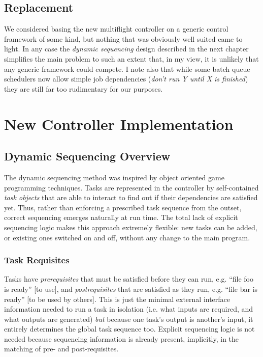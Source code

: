 \documentclass[11pt,a4paper]{report}
\begin{document}
\section{Replacement}

We considered basing the new multiflight controller on a generic control
framework of some kind, but nothing that was obviously well suited came
to light. In any case the {\em dynamic sequencing} design described in
the next chapter simplifies the main problem to such an extent that, in
my view, it is unlikely that any generic framework could compete. I note
also that while some batch queue schedulers now allow simple job
dependencies ({\em don't run Y until X is finished}) they are still far
too rudimentary for our purposes.


\chapter{New Controller Implementation}

\section{Dynamic Sequencing Overview}

The dynamic sequencing method was inspired by object oriented game
programming techniques. Tasks are represented in the controller by
self-contained {\em task objects} that are able to interact to find out
if their dependencies are satisfied yet. Thus, rather than enforcing a
prescribed task sequence from the outset, correct sequencing emerges
naturally at run time. The total lack of explicit sequencing logic makes
this approach extremely flexible: new tasks can be added, or existing
ones switched on and off, without any change to the main program.

\subsection{Task Requisites}

Tasks have {\em prerequisites} that must be satisfied before they can
run, e.g. ``file foo is ready'' [to use], and {\em postrequisites} that
are satisfied as they run, e.g. ``file bar is ready'' [to be used by
others]. This is just the minimal external interface information needed
to run a task in isolation (i.e. what inputs are required, and what
outputs are generated) {\em but} because one task's output is another's
input, it entirely determines the global task sequence too. Explicit
sequencing logic is not needed because sequencing information is already
present, implicitly, in the matching of pre- and post-requisites. 
\end{document}
